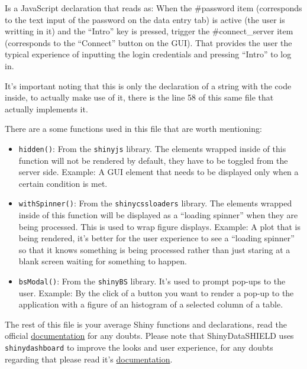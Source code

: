 \documentclass[
]{book}
\newenvironment{Shaded}{\begin{snugshade}}{\end{snugshade}}
\newcommand{\KeywordTok}[1]{\textcolor[rgb]{0.13,0.29,0.53}{\textbf{#1}}}
\newcommand{\NormalTok}[1]{#1}
\newcommand{\OperatorTok}[1]{\textcolor[rgb]{0.81,0.36,0.00}{\textbf{#1}}}
\providecommand{\tightlist}{%
  \setlength{\itemsep}{0pt}\setlength{\parskip}{0pt}}
\begin{document}
Is a JavaScript declaration that reads as: When the \#password item (corresponds to the text input of the password on the data entry tab) is active (the user is writting in it) and the ``Intro'' key is pressed, trigger the \#connect\_server item (corresponds to the ``Connect'' button on the GUI). That provides the user the typical experience of inputting the login credentials and pressing ``Intro'' to log in.

It's important noting that this is only the declaration of a string with the code inside, to actually make use of it, there is the line 58 of this same file that actually implements it.

\begin{Shaded}
\end{Shaded}

There are a some functions used in this file that are worth mentioning:

\begin{itemize}
\tightlist
\item
  \texttt{hidden()}: From the \texttt{shinyjs} library. The elements wrapped inside of this function will not be rendered by default, they have to be toggled from the server side. Example: A GUI element that needs to be displayed only when a certain condition is met.
\item
  \texttt{withSpinner()}: From the \texttt{shinycssloaders} library. The elements wrapped inside of this function will be displayed as a ``loading spinner'' when they are being processed. This is used to wrap figure displays. Example: A plot that is being rendered, it's better for the user experience to see a ``loading spinner'' so that it knows something is being processed rather than just staring at a blank screen waiting for something to happen.
\item
  \texttt{bsModal()}: From the \texttt{shinyBS} library. It's used to prompt pop-ups to the user. Example: By the click of a button you want to render a pop-up to the application with a figure of an histogram of a selected column of a table.
\end{itemize}

The rest of this file is your average Shiny functions and declarations, read the official \href{https://shiny.rstudio.com/reference/shiny/1.4.0/}{documentation} for any doubts. Please note that ShinyDataSHIELD uses \texttt{shinydashboard} to improve the looks and user experience, for any doubts regarding that please read it's \href{https://rstudio.github.io/shinydashboard/get_started.html}{documentation}.
\end{document}
